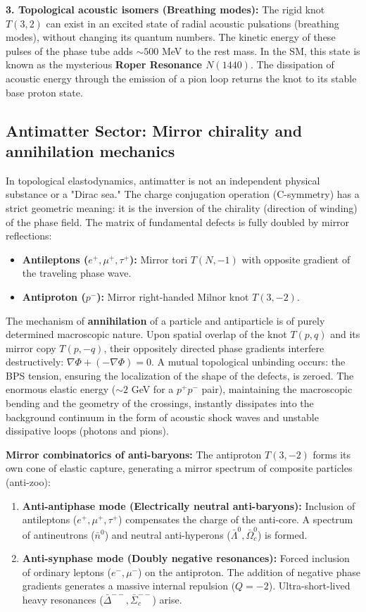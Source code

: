 \documentclass[11pt,a4paper]{article}
\begin{document}
\textbf{3. Topological acoustic isomers (Breathing modes):}
The rigid knot $T(3,2)$ can exist in an excited state of radial acoustic pulsations (breathing modes), without changing its quantum numbers. The kinetic energy of these pulses of the phase tube adds $\sim 500$ MeV to the rest mass. In the SM, this state is known as the mysterious \textbf{Roper Resonance $N(1440)$}. The dissipation of acoustic energy through the emission of a pion loop returns the knot to its stable base proton state.

\subsection{Antimatter Sector: Mirror chirality and annihilation mechanics}
In topological elastodynamics, antimatter is not an independent physical substance or a "Dirac sea." The charge conjugation operation (C-symmetry) has a strict geometric meaning: it is the inversion of the chirality (direction of winding) of the phase field. The matrix of fundamental defects is fully doubled by mirror reflections:
\begin{itemize}
    \item \textbf{Antileptons ($e^+, \mu^+, \tau^+$):} Mirror tori $T(N, -1)$ with opposite gradient of the traveling phase wave.
    \item \textbf{Antiproton ($p^-$):} Mirror right-handed Milnor knot $T(3, -2)$.
\end{itemize}

The mechanism of \textbf{annihilation} of a particle and antiparticle is of purely determined macroscopic nature. Upon spatial overlap of the knot $T(p,q)$ and its mirror copy $T(p,-q)$, their oppositely directed phase gradients interfere destructively: $\nabla \Phi + (-\nabla \Phi) = 0$. A mutual topological unbinding occurs: the BPS tension, ensuring the localization of the shape of the defects, is zeroed. The enormous elastic energy ($\sim 2$ GeV for a $p^+p^-$ pair), maintaining the macroscopic bending and the geometry of the crossings, instantly dissipates into the background continuum in the form of acoustic shock waves and unstable dissipative loops (photons and pions).

\textbf{Mirror combinatorics of anti-baryons:}
The antiproton $T(3,-2)$ forms its own cone of elastic capture, generating a mirror spectrum of composite particles (anti-zoo):
\begin{enumerate}
    \item \textbf{Anti-antiphase mode (Electrically neutral anti-baryons):} Inclusion of antileptons ($e^+, \mu^+, \tau^+$) compensates the charge of the anti-core. A spectrum of antineutrons ($\bar{n}^0$) and neutral anti-hyperons ($\bar{\Lambda}^0, \bar{\Omega}_c^0$) is formed.
    \item \textbf{Anti-synphase mode (Doubly negative resonances):} Forced inclusion of ordinary leptons ($e^-, \mu^-$) on the antiproton. The addition of negative phase gradients generates a massive internal repulsion ($Q=-2$). Ultra-short-lived heavy resonances ($\bar{\Delta}^{--}, \bar{\Sigma}_c^{--}$) arise.
\end{enumerate}
\end{document}
